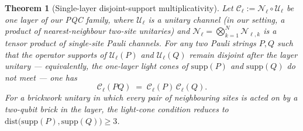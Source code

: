 \documentclass[%
 reprint,
superscriptaddress,
 amsmath,amssymb,
 aps,
]{revtex4-2}
\newcommand{\todoflag}[1]{\textcolor{red}{#1}}%
\newtheorem{theorem}{Theorem}[section]
\begin{document}

\begin{theorem}[Single-layer disjoint-support multiplicativity]
\label{thm:disjoint_multiplicativity}
Let $\mathcal{C}_\ell := \mathcal{N}_\ell\circ\mathcal{U}_\ell$ be \emph{one} layer of our PQC family, where $\mathcal{U}_\ell$ is a unitary channel (in our setting, a product of nearest-neighbour two-site unitaries) and $\mathcal{N}_\ell = \bigotimes_{k=1}^N\mathcal{N}_{\ell,k}$ is a tensor product of single-site Pauli channels. For any two Pauli strings $P,Q$ such that the operator supports of $\mathcal{U}_\ell(P)$ and $\mathcal{U}_\ell(Q)$ remain disjoint after the layer unitary --- equivalently, the one-layer light cones of $\mathrm{supp}(P)$ and $\mathrm{supp}(Q)$ do not meet --- one has
\begin{equation}
    \mathcal{C}_\ell(PQ) \;=\; \mathcal{C}_\ell(P)\,\mathcal{C}_\ell(Q).
    \label{eq:disjoint_mult}
\end{equation}
For a brickwork unitary in which every pair of neighbouring sites is acted on by a two-qubit brick in the layer, the light-cone condition reduces to $\mathrm{dist}\bigl(\mathrm{supp}(P),\mathrm{supp}(Q)\bigr)\ge 3$.
\end{theorem}
\end{document}
